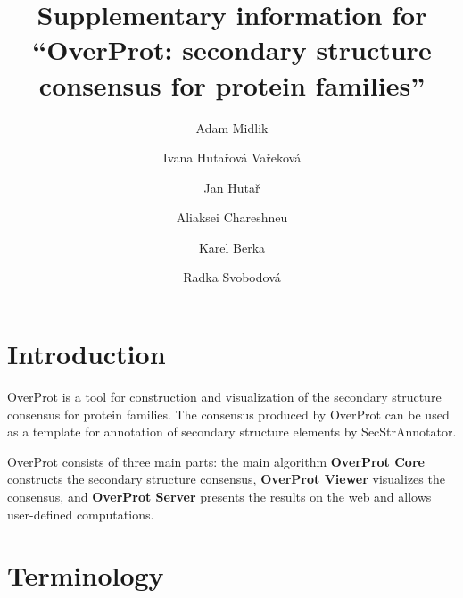 \documentclass[12pt,draft]{article}
\date{}
\begin{document}
\title{Supplementary information for \\ ``OverProt: secondary structure consensus for protein families''}


\author[1,2]{Adam Midlik}
\author[1,2,3]{Ivana Hutařová Vařeková}
\author[1,2]{Jan Hutař}
\author[1,2]{Aliaksei Chareshneu}
\author[4,*]{Karel Berka}
\author[1,2,*]{Radka Svobodová}



\maketitle


\renewcommand*\contentsname{Table of contents}
{
\setcounter{tocdepth}{3}
\tableofcontents
}
\hypertarget{introduction}{%
\section{Introduction}\label{introduction}}

OverProt is a tool for construction and visualization of the secondary
structure consensus for protein families. The consensus produced by
OverProt can be used as a template for annotation of secondary structure
elements by SecStrAnnotator.

OverProt consists of three main parts: the main algorithm
\textbf{OverProt Core} constructs the secondary structure consensus,
\textbf{OverProt Viewer} visualizes the consensus, and \textbf{OverProt
Server} presents the results on the web and allows user-defined
computations.

\hypertarget{terminology}{%
\section{Terminology}\label{terminology}}
\end{document}
